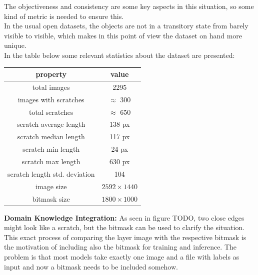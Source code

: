 The objectiveness and consistency are some key aspects in this situation, so some kind of metric is needed to ensure this.\\
In the usual open datasets, the objects are not in a transitory state from barely visible to visible, which makes in this point of view the dataset on hand more unique. \\
In the table below some relevant statistics about the dataset are presented:
\begin{center}
\begin{tabular}{ ||c|c|| }
\hline
property & value \\ [0.5ex]
\hline\hline
total images & 2295 \\
images with scratches & $\approx$ 300 \\
total scratches & $\approx$ 650 \\
scratch average length & 138 px \\
scratch median length & 117 px \\
scratch min length & 24 px \\
scratch max length & 630 px \\
scratch length std. deviation & 104 \\
image size & $2592 \times 1440$ \\
bitmask size & $1800 \times 1000$ \\

\hline
\end{tabular}
\end{center}


\textbf{Domain Knowledge Integration:}
As seen in figure TODO, two close edges might look like a scratch, but the bitmask can be used to clarify the situation. This exact process of comparing the layer image with the respective bitmask is the motivation of including also the bitmask for training and inference. The problem is that most models take exactly one image and a file with labels as input and now a bitmask needs to be included somehow.\\

